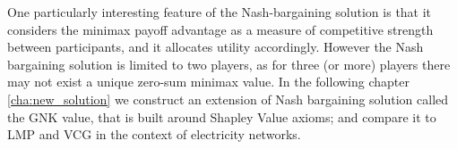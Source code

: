 One particularly interesting feature of the Nash-bargaining solution is that it considers the minimax payoff advantage as a measure of competitive strength between participants, and it allocates utility accordingly.
However the Nash bargaining solution is limited to two players, as for three (or more) players there may not exist a unique zero-sum minimax value.
In the following chapter \ref{cha:new_solution} we construct an extension of Nash bargaining solution called the GNK value, that is built around Shapley Value axioms; and compare it to LMP and VCG in the context of electricity networks.




